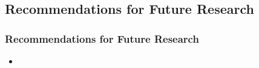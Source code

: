 \documentclass[compress,handout,10pt]{beamer}
\let\olditem\item
\renewcommand{\item}{\setlength{\itemsep}{0.5\baselineskip}\olditem}
\begin{document}
\subsection{Recommendations for Future Research}

\begin{frame}
	\frametitle {Recommendations for Future Research}
	\begin {itemize}
		\item 
	\end {itemize}
\end{frame}

%
\end{document}
